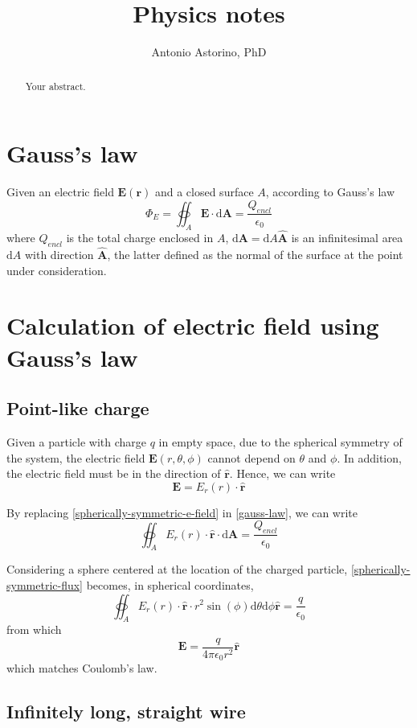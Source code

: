 \documentclass{report}
\title{Physics notes}
\author{Antonio Astorino, PhD}
\newcommand{\uvec}[1]{\boldsymbol{\hat{\textbf{$#1$}}}}
\newcommand{\be}{\begin{equation}}
\newcommand{\ee}{\end{equation}}
\begin{document}
\maketitle

\begin{abstract}
Your abstract.
\end{abstract}

\section{Gauss's law}
Given an electric field $\mathbf{E}(\mathbf{r})$ and a closed surface $A$, according to Gauss's law
\be\label{gauss-law}
\Phi_E = \oiint_A \mathbf{E} \cdot \mathrm{d}\mathbf{A} =\frac{Q_{encl}}{\epsilon_0}
\ee
where $Q_{encl}$ is the total charge enclosed in $A$, $\mathrm{d}\mathbf{A}=\mathrm{d}A\uvec{A}$ is an infinitesimal area $\mathrm{d}A$ with direction $\uvec{A}$, the latter defined as the normal of the surface at the point under consideration.

\section{Calculation of electric field using Gauss's law}
\subsection{Point-like charge}
Given a particle with charge $q$ in empty space, due to the spherical symmetry of the system, the electric field $\mathbf{E}(r,\theta,\phi)$ cannot depend on $\theta$ and $\phi$. In addition, the electric field must be in the direction of $\uvec{r}$. Hence, we can write
\be\label{spherically-symmetric-e-field}
\mathbf{E} = E_r(r) \cdot \uvec{r}
\ee

By replacing \ref{spherically-symmetric-e-field} in \ref{gauss-law}, we can write
\be\label{spherically-symmetric-flux}
\oiint_A E_r(r) \cdot \uvec{r} \cdot \mathrm{d}\mathbf{A} =\frac{Q_{encl}}{\epsilon_0}
\ee

Considering a sphere centered at the location of the charged particle, \ref{spherically-symmetric-flux} becomes, in spherical coordinates,
\be\label{spherically-symmetric-flux-2}
\oiint_A E_r(r) \cdot \uvec{r} \cdot r^{2}\sin(\phi)\mathrm{d}\theta\mathrm{d}\phi\uvec{r} =\frac{q}{\epsilon_0}
\ee
from which
\be
\mathbf{E}=\frac{q}{4\pi\epsilon_0 r^{2}}\uvec{r}
\ee
which matches Coulomb's law.


\subsection{Infinitely long, straight wire}
\end{document}
